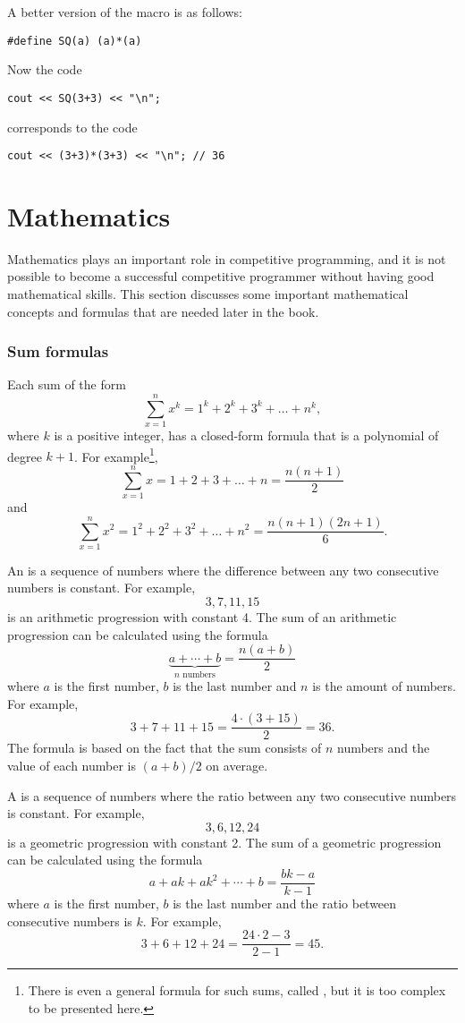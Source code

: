 A better version of the macro is as follows:
\begin{lstlisting}
#define SQ(a) (a)*(a)
\end{lstlisting}
Now the code
\begin{lstlisting}
cout << SQ(3+3) << "\n";
\end{lstlisting}
corresponds to the code
\begin{lstlisting}
cout << (3+3)*(3+3) << "\n"; // 36
\end{lstlisting}


\section{Mathematics}

Mathematics plays an important role in competitive
programming, and it is not possible to become
a successful competitive programmer without
having good mathematical skills.
This section discusses some important
mathematical concepts and formulas that
are needed later in the book.

\subsubsection{Sum formulas}

Each sum of the form
\[\sum_{x=1}^n x^k = 1^k+2^k+3^k+\ldots+n^k,\]
where $k$ is a positive integer,
has a closed-form formula that is a
polynomial of degree $k+1$.
For example\footnote{
There is even a general formula for such sums, called ,
but it is too complex to be presented here.},
\[\sum_{x=1}^n x = 1+2+3+\ldots+n = \frac{n(n+1)}{2}\]
and
\[\sum_{x=1}^n x^2 = 1^2+2^2+3^2+\ldots+n^2 = \frac{n(n+1)(2n+1)}{6}.\]

An  is a 
sequence of numbers
where the difference between any two consecutive
numbers is constant.
For example,
\[3, 7, 11, 15\]
is an arithmetic progression with constant 4.
The sum of an arithmetic progression can be calculated
using the formula
\[\underbrace{a + \cdots + b}_{n \,\, \textrm{numbers}} = \frac{n(a+b)}{2}\]
where $a$ is the first number,
$b$ is the last number and
$n$ is the amount of numbers.
For example,
\[3+7+11+15=\frac{4 \cdot (3+15)}{2} = 36.\]
The formula is based on the fact
that the sum consists of $n$ numbers and
the value of each number is $(a+b)/2$ on average.

A  is a sequence
of numbers
where the ratio between any two consecutive
numbers is constant.
For example,
\[3,6,12,24\]
is a geometric progression with constant 2.
The sum of a geometric progression can be calculated
using the formula
\[a + ak + ak^2 + \cdots + b = \frac{bk-a}{k-1}\]
where $a$ is the first number,
$b$ is the last number and the
ratio between consecutive numbers is $k$.
For example,
\[3+6+12+24=\frac{24 \cdot 2 - 3}{2-1} = 45.\]

